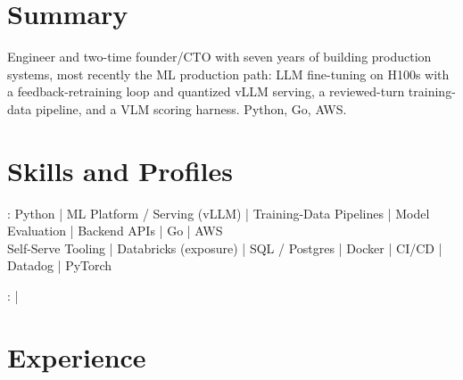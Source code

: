 \documentclass[print]{jack-resume}
\begin{document}
\pagecolor{darkmodeBackground}


\begin{minipage}[t][1cm][t]{.03\textwidth}
    \hfill
\end{minipage}

\section{Summary}
Engineer and two-time founder/CTO with seven years of building production systems, most recently the ML production path: LLM fine-tuning on H100s with a feedback-retraining loop and quantized vLLM serving, a reviewed-turn training-data pipeline, and a VLM scoring harness. Python, Go, AWS.
\sectionsep

\section{Skills and Profiles}
:
Python \hfill | \hfill
ML Platform / Serving (vLLM) \hfill | \hfill
Training-Data Pipelines \hfill | \hfill
Model Evaluation \hfill | \hfill
Backend APIs \hfill | \hfill
Go \hfill | \hfill
AWS \\
\hspace{1.0cm} Self-Serve Tooling \hfill | \hfill
Databricks (exposure) \hfill | \hfill
SQL / Postgres \hfill | \hfill
Docker \hfill | \hfill
CI/CD \hfill | \hfill
Datadog \hfill | \hfill
PyTorch \\

\raggedright{
    :
      \href{https://www.linkedin.com/in/jack-sturtevant/}{ \ExternalLink} |
     \href{https://github.com/jacksturt}{ \ExternalLink}}

\section{Experience}
\end{document}

